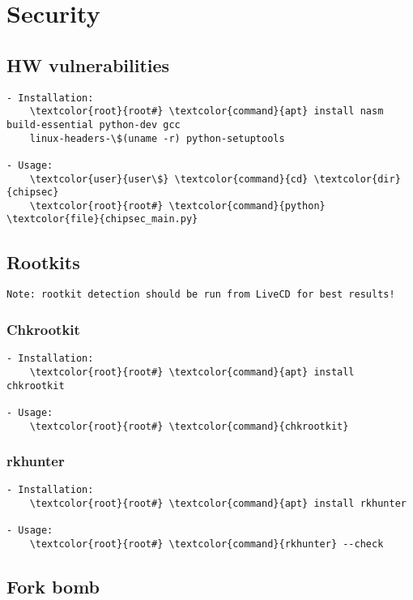 \documentclass[10pt, a4paper, onecolumn, openany]{book} %
\begin{document}
\chapter{Security}
\section{HW vulnerabilities}
\begin{Verbatim}[commandchars=\\\{\}]
- Installation:
    \textcolor{root}{root#} \textcolor{command}{apt} install nasm build-essential python-dev gcc 
    linux-headers-\$(uname -r) python-setuptools
    
- Usage: 
    \textcolor{user}{user\$} \textcolor{command}{cd} \textcolor{dir}{chipsec}
    \textcolor{root}{root#} \textcolor{command}{python} \textcolor{file}{chipsec_main.py}
\end{Verbatim}
\section{Rootkits}
\begin{Verbatim}[commandchars=\\\{\}]
Note: rootkit detection should be run from LiveCD for best results!
\end{Verbatim}
\subsection{Chkrootkit}
\begin{Verbatim}[commandchars=\\\{\}]
- Installation:
    \textcolor{root}{root#} \textcolor{command}{apt} install chkrootkit

- Usage:
    \textcolor{root}{root#} \textcolor{command}{chkrootkit}
\end{Verbatim}
\subsection{rkhunter}
\begin{Verbatim}[commandchars=\\\{\}]
- Installation:
    \textcolor{root}{root#} \textcolor{command}{apt} install rkhunter

- Usage:
    \textcolor{root}{root#} \textcolor{command}{rkhunter} --check
\end{Verbatim}

\section{Fork bomb}
\end{document}
